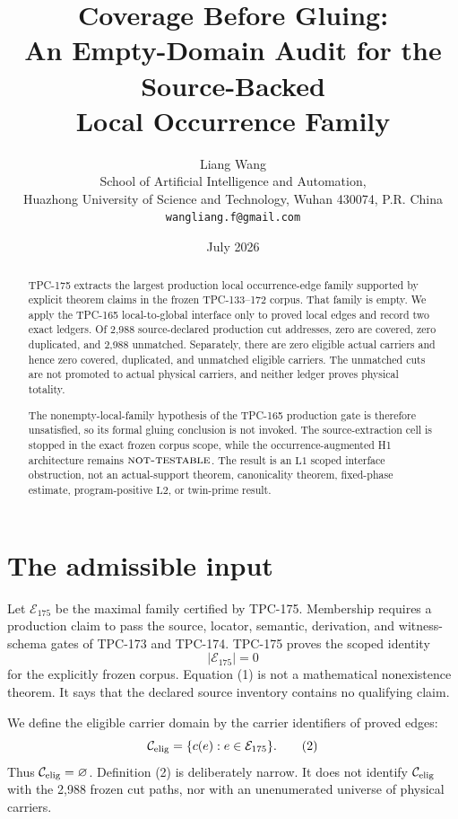\documentclass[11pt]{article}
\title{\textbf{Coverage Before Gluing:}\\
\textbf{An Empty-Domain Audit for the Source-Backed}\\
\textbf{Local Occurrence Family}}
\author{Liang Wang\\
School of Artificial Intelligence and Automation,\\
Huazhong University of Science and Technology, Wuhan 430074, P.R. China\\
\texttt{wangliang.f@gmail.com}}
\date{July 2026}
\theoremstyle{definition}
\theoremstyle{remark}
\newcommand{\Lone}{\mathrm{L1}}
\newcommand{\Ltwo}{\mathrm{L2}}
\newcommand{\NT}{\textnormal{\textsc{not-testable}}}
\begin{document}
\maketitle

\begin{abstract}
TPC-175 extracts the largest production local occurrence-edge family
supported by explicit theorem claims in the frozen TPC-133--172
corpus.  That family is empty.  We apply the TPC-165 local-to-global
interface only to proved local edges and record two exact ledgers.
Of 2,988 source-declared production cut addresses, zero are covered,
zero duplicated, and 2,988 unmatched.  Separately, there are zero
eligible actual carriers and hence zero covered, duplicated, and
unmatched eligible carriers.  The unmatched cuts are not promoted to
actual physical carriers, and neither ledger proves physical totality.

The nonempty-local-family hypothesis of the TPC-165 production gate
is therefore unsatisfied, so its formal gluing conclusion is not
invoked.  The source-extraction cell is stopped in the exact frozen
corpus scope, while the occurrence-augmented H1 architecture remains
\(\NT\).  The result is an \(\Lone\) scoped interface obstruction,
not an actual-support theorem, canonicality theorem, fixed-phase
estimate, program-positive \(\Ltwo\), or twin-prime result.
\end{abstract}

\section{The admissible input}

Let \(\mathcal E_{175}\) be the maximal family certified by TPC-175.
Membership requires a production claim to pass the source, locator,
semantic, derivation, and witness-schema gates of TPC-173 and
TPC-174.  TPC-175 proves the scoped identity
\[
  |\mathcal E_{175}|=0                                             \tag{1}
\]
for the explicitly frozen corpus.  Equation (1) is not a
mathematical nonexistence theorem.  It says that the declared source
inventory contains no qualifying claim.

We define the eligible carrier domain by the carrier identifiers of
proved edges:
\[
  \mathcal C_{\rm elig}
  =\{c(e):e\in\mathcal E_{175}\}.                                  \tag{2}
\]
Thus \(\mathcal C_{\rm elig}=\varnothing\).  Definition (2) is
deliberately narrow.  It does not identify \(\mathcal C_{\rm elig}\)
with the 2,988 frozen cut paths, nor with an unenumerated universe of
physical carriers.
\end{document}
